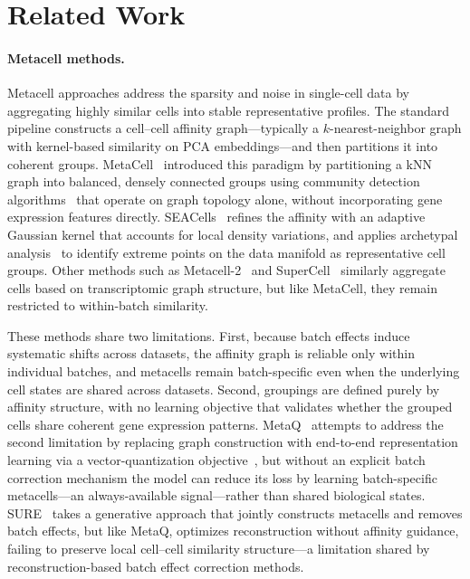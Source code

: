 \section{Related Work}

\paragraph{Metacell methods.}
Metacell approaches address the sparsity and noise in single-cell data by aggregating highly similar cells into stable representative profiles.
The standard pipeline constructs a cell--cell affinity graph---typically a $k$-nearest-neighbor graph with kernel-based similarity on PCA embeddings---and then partitions it into coherent groups.
MetaCell~\citep{metacell} introduced this paradigm by partitioning a kNN graph into balanced, densely connected groups using community detection algorithms~\citep{louvain, traag2019leiden} that operate on graph topology alone, without incorporating gene expression features directly.
SEACells~\citep{seacells} refines the affinity with an adaptive Gaussian kernel that accounts for local density variations, and applies archetypal analysis~\citep{cutler1994archetypal} to identify extreme points on the data manifold as representative cell groups.
Other methods such as Metacell-2~\citep{metacell2} and SuperCell~\citep{supercell} similarly aggregate cells based on transcriptomic graph structure, but like MetaCell, they remain restricted to within-batch similarity.

These methods share two limitations.
First, because batch effects induce systematic shifts across datasets, the affinity graph is reliable only within individual batches, and metacells remain batch-specific even when the underlying cell states are shared across datasets.
Second, groupings are defined purely by affinity structure, with no learning objective that validates whether the grouped cells share coherent gene expression patterns.
MetaQ~\citep{metaq} attempts to address the second limitation by replacing graph construction with end-to-end representation learning via a vector-quantization objective~\citep{vqvae}, but without an explicit batch correction mechanism the model can reduce its loss by learning batch-specific metacells---an always-available signal---rather than shared biological states.
SURE~\citep{sure} takes a generative approach that jointly constructs metacells and removes batch effects, but like MetaQ, optimizes reconstruction without affinity guidance, failing to preserve local cell--cell similarity structure---a limitation shared by reconstruction-based batch effect correction methods.

